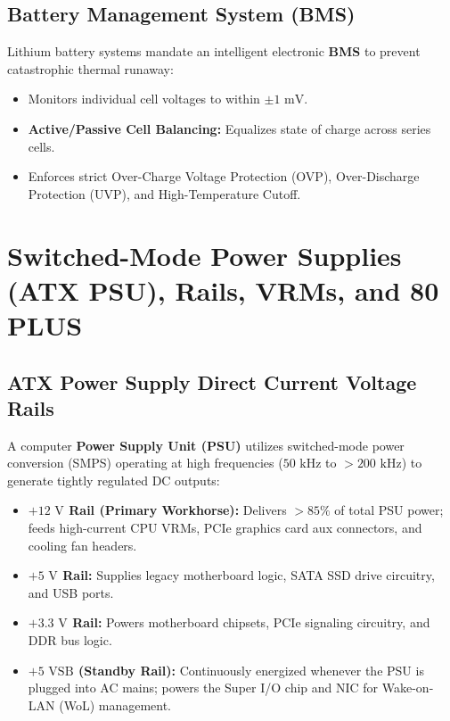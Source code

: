 \subsection{Battery Management System (BMS)}
Lithium battery systems mandate an intelligent electronic \textbf{BMS} to prevent catastrophic thermal runaway:
\begin{itemize}
    \item Monitors individual cell voltages to within $\pm 1\text{ mV}$.
    \item \textbf{Active/Passive Cell Balancing:} Equalizes state of charge across series cells.
    \item Enforces strict Over-Charge Voltage Protection (OVP), Over-Discharge Protection (UVP), and High-Temperature Cutoff.
\end{itemize}


\section{Switched-Mode Power Supplies (ATX PSU), Rails, VRMs, and 80 PLUS}
\label{sec:psu_vrm}

\subsection{ATX Power Supply Direct Current Voltage Rails}
A computer \textbf{Power Supply Unit (PSU)} utilizes switched-mode power conversion (SMPS) operating at high frequencies ($50\text{ kHz}$ to $>200\text{ kHz}$) to generate tightly regulated DC outputs:
\begin{itemize}
    \item \textbf{$+12\text{ V}$ Rail (Primary Workhorse):} Delivers $>85\%$ of total PSU power; feeds high-current CPU VRMs, PCIe graphics card aux connectors, and cooling fan headers.
    \item \textbf{$+5\text{ V}$ Rail:} Supplies legacy motherboard logic, SATA SSD drive circuitry, and USB ports.
    \item \textbf{$+3.3\text{ V}$ Rail:} Powers motherboard chipsets, PCIe signaling circuitry, and DDR bus logic.
    \item \textbf{$+5\text{ VSB}$ (Standby Rail):} Continuously energized whenever the PSU is plugged into AC mains; powers the Super I/O chip and NIC for Wake-on-LAN (WoL) management.
\end{itemize}

